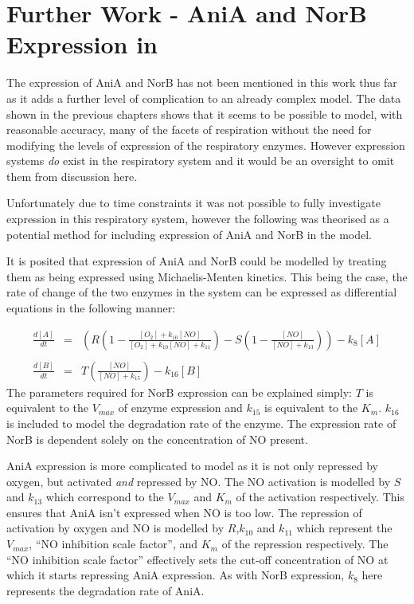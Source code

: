 \chapter[AniA and NorB Expression in \Nm{}]{Further Work - AniA and NorB Expression in \Nm{}}
\label{chap:expression}
The expression of AniA and NorB has not been mentioned in this work thus far as it adds a further level of complication to an already complex model. The data shown in the previous chapters shows that it seems to be possible to model, with reasonable accuracy, many of the facets of respiration without the need for modifying the levels of expression of the respiratory enzymes. However expression systems \textit{do} exist in the respiratory system and it would be an oversight to omit them from discussion here.

Unfortunately due to time constraints it was not possible to fully investigate expression in this respiratory system, however the following was theorised as a potential method for including expression of AniA and NorB in the model.

It is posited that expression of AniA and NorB could be modelled by treating them as being expressed using Michaelis-Menten kinetics. This being the case, the rate of change of the two enzymes in the system can be expressed as differential equations in the following manner:

\begin{eqnarray*}
\frac{d[A]}{dt} & = & \left(R\left(1 - \frac{[O_2] + k_{10}[NO]}{[O_2] + k_{10}[NO] + k_{11}}\right) - S\left(1 - \frac{[NO]}{[NO] + k_{13}}\right)\right) - k_8[A] \nonumber \\ \\
\frac{d[B]}{dt} & = & T \left(\frac{[NO]}{[NO] + k_{15}}\right) - k_{16}[B]
\end{eqnarray*}
The parameters required for NorB expression can be explained simply: $T$ is equivalent to the $V_{max}$ of enzyme expression and $k_{15}$ is equivalent to the $K_m$. $k_{16}$ is included to model the degradation rate of the enzyme. The expression rate of NorB is dependent solely on the concentration of NO present.

AniA expression is more complicated to model as it is not only repressed by oxygen, but activated \textit{and} repressed by NO. The NO activation is modelled by $S$ and $k_{13}$ which correspond to the $V_{max}$ and $K_m$ of the activation respectively. This ensures that AniA isn't expressed when NO is too low. The repression of activation by oxygen and NO is modelled by $R$,$k_{10}$ and $k_{11}$ which represent the $V_{max}$, ``NO inhibition scale factor'', and $K_m$ of the repression respectively. The ``NO inhibition scale factor'' effectively sets the cut-off concentration of NO at which it starts repressing AniA expression. As with NorB expression, $k_8$ here represents the degradation rate of AniA.

